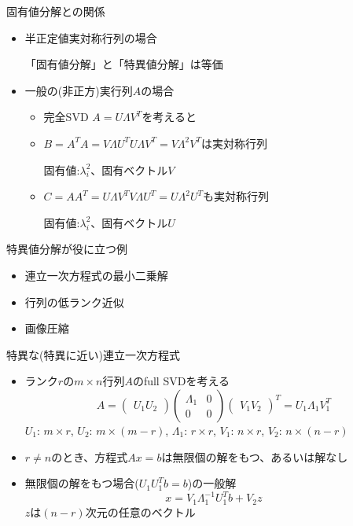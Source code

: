 \begin{frame}[t,fragile]{固有値分解との関係}
  \begin{itemize}
    \setlength{\itemsep}{1em}
  \item 半正定値実対称行列の場合

    「固有値分解」と「特異値分解」は等価
  \item 一般の(非正方)実行列$A$の場合
    \begin{itemize}
      \setlength{\itemsep}{1em}
    \item 完全SVD  $A=U \Lambda V^T$を考えると
    \item $B=A^T A = V \Lambda U^T U \Lambda V^T = V \Lambda^2 V^T$は実対称行列

      固有値:$\lambda_i^2$、固有ベクトル$V$
    \item $C=A A^T = U \Lambda V^T V \Lambda U^T = U \Lambda^2 U^T$も実対称行列

      固有値:$\lambda_i^2$、固有ベクトル$U$
    \end{itemize}
  \end{itemize}
\end{frame}

\begin{frame}[t,fragile]{特異値分解が役に立つ例}
  \begin{itemize}
    \setlength{\itemsep}{1em}
  \item 連立一次方程式の最小二乗解
  \item 行列の低ランク近似
  \item 画像圧縮
  \end{itemize}
\end{frame}

\begin{frame}[t,fragile]{特異な(特異に近い)連立一次方程式}
  \begin{itemize}
  \item ランク$r$の$m \times n$行列$A$のfull SVDを考える
    \[
    A = \begin{pmatrix} U_1 U_2 \end{pmatrix} \begin{pmatrix} \Lambda_1 & 0 \\ 0 & 0 \end{pmatrix} \begin{pmatrix} V_1 V_2 \end{pmatrix}^T = U_1 \Lambda_1 V_1^T
    \]
    $U_1$: $m \times r$, $U_2$: $m \times (m-r)$, $\Lambda_1$: $r \times r$, $V_1$: $n \times r$, $V_2$: $n \times (n-r)$
  \item $r \ne n$のとき、方程式$Ax=b$は無限個の解をもつ、あるいは解なし
  \item 無限個の解をもつ場合($U_1U_1^Tb=b$)の一般解
    \[
    x = V_1 \Lambda_1^{-1} U_1^T b + V_2 z
    \]
    $z$は$(n-r)$次元の任意のベクトル
  \end{itemize}
\end{frame}

